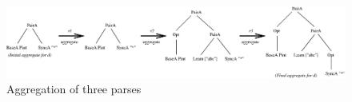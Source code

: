 \begin{figure}[t]
\begin{center}
\includegraphics[width=2\columnwidth]{aggregate}
\caption{Aggregation of three parses}\label{fig:aggregate}
\end{center}
\end{figure}


%


